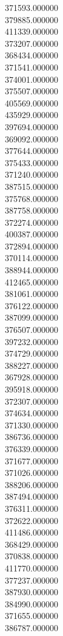 371593.000000\\
379885.000000\\
411339.000000\\
373207.000000\\
368434.000000\\
371541.000000\\
374001.000000\\
375507.000000\\
405569.000000\\
435929.000000\\
397694.000000\\
369092.000000\\
377644.000000\\
375433.000000\\
371240.000000\\
387515.000000\\
375768.000000\\
387758.000000\\
372274.000000\\
400387.000000\\
372894.000000\\
370114.000000\\
388944.000000\\
412465.000000\\
381061.000000\\
376122.000000\\
387099.000000\\
376507.000000\\
397232.000000\\
374729.000000\\
388227.000000\\
367928.000000\\
395918.000000\\
372307.000000\\
374634.000000\\
371330.000000\\
386736.000000\\
376339.000000\\
371677.000000\\
371026.000000\\
388206.000000\\
387494.000000\\
376311.000000\\
372622.000000\\
411486.000000\\
368429.000000\\
370838.000000\\
411770.000000\\
377237.000000\\
387930.000000\\
384990.000000\\
371655.000000\\
386787.000000\\
